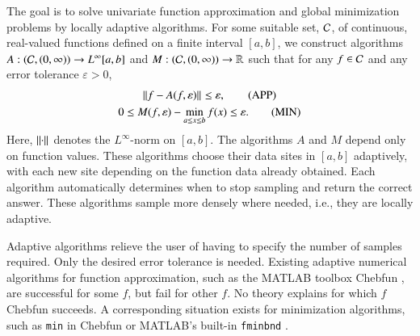 \documentclass[review]{elsarticle}
\newcommand{\abstol}{\varepsilon}
\theoremstyle{definition}
\begin{document}
The goal is to solve univariate function approximation and global minimization problems by locally adaptive algorithms. For some suitable set, $\mathcal{C}$, of continuous,
real-valued functions defined on a finite interval $[a,b]$, we  construct
algorithms $A:(\mathcal{C},(0,\infty)) \to L^{\infty}[a,b]$ and $M: (\mathcal{C},(0,\infty)) \to
\mathbb{R}$ such that for any $f \in \mathcal{C}$ and any error tolerance $\abstol > 0$,
\begin{gather}
\norm{f - A(f,\abstol)} \le \abstol,  \tag{APP} \label{appxprob} \\
0 \le M(f,\abstol) - \min_{a \le x \le b} f(x)  \le \abstol. \tag{MIN} \label{optprob}
\end{gather}
Here, $\left \lVert \cdot \right \rVert_{{}}$ denotes the $L^{\infty}$-norm on $[a,b]$.  The algorithms $A$ and $M$ depend only on function values. These algorithms choose their data sites in $[a,b]$ adaptively, with each new site depending on the function data already obtained.  Each algorithm  automatically determines when to stop sampling
and return the correct answer.  These algorithms sample more densely where needed, i.e., they are locally adaptive.

Adaptive algorithms relieve the user of having to specify the number of samples required.  Only the desired error tolerance is needed.  Existing adaptive numerical algorithms for function approximation, such as the MATLAB toolbox Chebfun \citep{TrefEtal16a}, are successful for some $f$, but fail for other $f$.  No theory explains for which $f$ Chebfun succeeds.   A corresponding situation exists for minimization algorithms, such as \texttt{min} in Chebfun or MATLAB's built-in \texttt{fminbnd} \citep{MAT9.0}.
\end{document}
